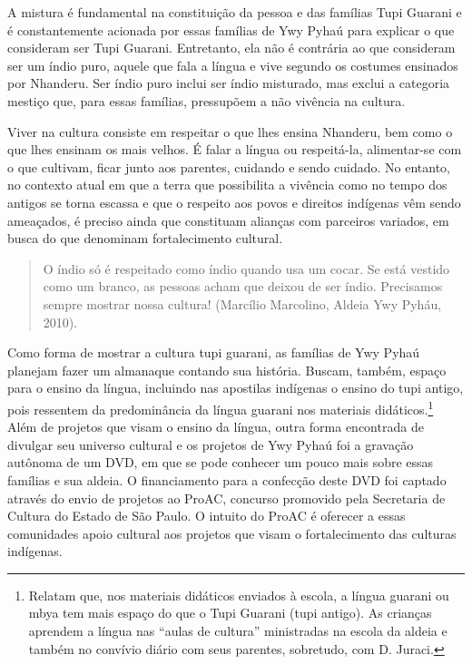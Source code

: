 A mistura é fundamental na constituição da pessoa e das famílias Tupi
Guarani e é constantemente acionada por essas famílias de Ywy Pyhaú
para explicar o que consideram ser Tupi Guarani. Entretanto, ela não é
contrária ao que consideram ser um índio puro, aquele que fala a língua
e vive segundo os costumes ensinados por Nhanderu. Ser índio puro
inclui ser índio misturado, mas exclui a categoria mestiço que, para
essas famílias, pressupõem a não vivência na cultura.

Viver na cultura consiste em respeitar o que lhes ensina Nhanderu, bem
como o que lhes ensinam os mais velhos. É falar a língua ou
respeitá-la, alimentar-se com o que cultivam, ficar junto aos parentes,
cuidando e sendo cuidado. No entanto, no contexto atual em que a terra
que possibilita a vivência como no tempo dos antigos se torna escassa e
que o respeito aos povos e direitos indígenas vêm sendo ameaçados, é
preciso ainda que constituam alianças com parceiros variados, em busca
do que denominam fortalecimento cultural.  

\begin{quotation}
O índio só é respeitado como índio quando usa um cocar. Se está vestido
como um branco, as pessoas acham que deixou de ser índio. Precisamos
sempre mostrar nossa cultura! (Marcílio Marcolino, Aldeia Ywy Pyháu,
2010).
\end{quotation}

Como forma de mostrar a cultura tupi guarani, as famílias de Ywy Pyhaú
planejam fazer um almanaque contando sua história. Buscam, também,
espaço para o ensino da língua, incluindo nas apostilas indígenas o
ensino do tupi antigo, pois ressentem da predominância da língua
guarani nos materiais didáticos.\footnote{Relatam que, nos materiais
didáticos enviados à escola, a língua guarani ou mbya tem mais espaço
do que o Tupi Guarani (tupi antigo). As crianças aprendem a língua nas
``aulas de cultura'' ministradas na escola da aldeia e também no convívio
diário com seus parentes, sobretudo, com D. Juraci.} Além de projetos
que visam o ensino da língua, outra forma encontrada de divulgar seu
universo cultural e os projetos de Ywy Pyhaú foi a gravação autônoma de
um DVD, em que se pode conhecer um pouco mais sobre essas famílias e
sua aldeia. O financiamento para a confecção deste DVD foi captado
através do envio de projetos ao ProAC, concurso promovido pela
Secretaria de Cultura do Estado de São Paulo. O intuito do ProAC é
oferecer a essas comunidades apoio cultural aos projetos que visam o
fortalecimento das culturas indígenas. 

